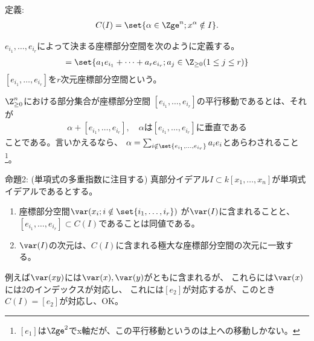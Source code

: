 \begin{framed}
  定義:
  \begin{align}
    C(I) = \set{\alpha \in \Zge^n; x^\alpha \notin I}.
  \end{align}

  $e_{i_1},\dots,e_{i_r}$によって決まる座標部分空間を次のように定義する。
  \begin{align}
    [e_{i_1},\dots,e_{i_r}] =
    \set{a_1 e_{i_1} + \dots + a_r e_{i_r}; a_j \in \Z_{\ge 0} (1\le j \le r)}
  \end{align}
  $[e_{i_1},\dots,e_{i_r}]$を$r$次元座標部分空間という。

  $\Z_{\ge 0}^n$における部分集合が座標部分空間
  $[e_{i_1},\dots,e_{i_r}]$の平行移動であるとは、それが
  \begin{align}
    \alpha  + [e_{i_1},\dots,e_{i_r}],\quad
    \alpha は [e_{i_1},\dots,e_{i_r}] に垂直である
  \end{align}
  ことである。言いかえるなら、
  $\alpha = \sum_{i\notin \set{e_{i_1},\dots,e_{i_r}}} a_i e_i$とあらわされること
  \footnote{$[e_1]$は$\Zge^2$でx軸だが、この平行移動というのは上への移動しかない。}。
\end{framed}

\begin{framed}
  命題2: (単項式の多重指数に注目する)
  真部分イデアル$I\subset k[x_1,\dots,x_n]$が単項式イデアルであるとする。
  \begin{enumerate}[label=(\roman*)]
    \item 座標部分空間$\var(x_i; i\notin \set{i_1,\dots,i_r})$
    が$\var(I)$に含まれることと、
    $[e_{i_1},\dots,e_{i_r}] \subset C(I)$であることは同値である。
    \item
    $\var(I)$の次元は、$C(I)$に含まれる極大な座標部分空間の次元に一致する。
  \end{enumerate}
\end{framed}
例えば$\var(xy)$には$\var(x),\var(y)$がともに含まれるが、
これらには$\var(x)$には${2}$のインデックスが対応し、
これには$[e_2]$が対応するが、このとき$C(I)=[e_2]$が対応し、OK。

